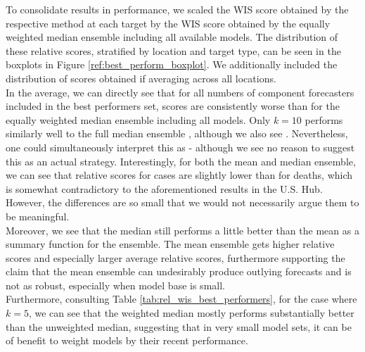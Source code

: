 To consolidate results in performance, we scaled the WIS score obtained by the respective method at each target by the WIS score obtained by the equally weighted median ensemble including all available models. The distribution of these relative scores, stratified by location and target type, can be seen in the boxplots in Figure \ref{ref:best_perform_boxplot}. We additionally included the distribution of scores obtained if averaging across all locations.\\
In the average, we can directly see that for all numbers of component forecasters included in the best performers set, scores are consistently worse than for the equally weighted median ensemble including all models. Only $k = 10$ performs similarly well to the full median ensemble , although we also see . Nevertheless, one could simultaneously interpret this as - although we see no reason to suggest this as an actual strategy. Interestingly, for both the mean and median ensemble, we can see that relative scores for cases are slightly lower than for deaths, which is somewhat contradictory to the aforementioned results in the U.S. Hub. However, the differences are so small that we would not necessarily argue them to be meaningful.\\
Moreover, we see that the median still performs a little better than the mean as a summary function for the ensemble. The mean ensemble gets higher relative scores and especially larger average relative scores, furthermore supporting the claim that the mean ensemble can undesirably produce outlying forecasts and is not as robust, especially when model base is small.\\
Furthermore, consulting Table \ref{tab:rel_wis_best_performers}, for the case where $k = 5$, we can see that the weighted median mostly performs substantially better than the unweighted median, suggesting that in very small model sets, it can be of benefit to weight models by their recent performance. \\
